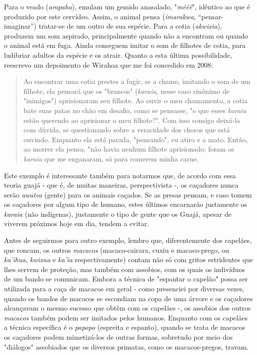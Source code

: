 Para o veado (\emph{arapaha}), emulam um gemido anasalado,
"\emph{mẽẽẽ}", idêntico ao que é produzido por este cervídeo. Assim, o
animal pensa (\emph{imarakwa}, ``pensar-imaginar'') tratar-se de um
outro de sua espécie. Para a cotia (\emph{akwixia}), produzem um som
aspirado, principalmente quando não a encontram ou quando o animal está
em fuga. Ainda conseguem imitar o som de filhotes de cotia, para
ludibriar adultos da espécie e os atrair. Quanto a esta última
possibilidade, reescrevo um depoimento de Wirahoa que me foi concedido
em 2008:

\begin{quote}
Ao encontrar uma cotia prestes a fugir, se a chamo, imitando o som de
um filhote, ela pensará que os "brancos" (\emph{karaia}, nesse caso
sinônimo de "inimigos") aprisionaram seu filhote. Ao ouvir o meu
chamamento, a cotia bate suas patas no chão em desafio, como se
pensasse, "o que esses \emph{karaia} estão querendo ao aprisionar o meu
filhote?". Com isso consigo deixá-la com dúvida, se questionando sobre a
veracidade dos choros que está ouvindo. Enquanto ela está parada,
"pensando", eu atiro e a mato. Então, ao morrer ela pensa, "não havia
nenhum filhote aprisionado; foram os \emph{karaia} que me enganaram, só
para comerem minha carne.
\end{quote}

Este exemplo é interessante também para notarmos que, de acordo com essa
teoria guajá - que é, de muitas maneiras, perspectivista -, os caçadores
nunca serão \emph{awatea} (gente) para os animais caçados. Se as presas
pensam, e caso tomem os caçadores por algum tipo de humano, estes
últimos encarnarão justamente os \emph{karaia} (não indígenas),
justamente o tipo de gente que os Guajá, apesar de viverem próximos hoje
em dia, tendem a evitar.

Antes de seguirmos para outro exemplo, lembro que, diferentemente dos
capelães, que roncam, os outros \emph{macacos} (macaco-cairara, cuxiu e
macaco-prego, ou \emph{ka'ihua}, \emph{kwixua} e \emph{ka'ia}
respectivamente) contam não só com gritos estridentes que lhes servem de
proteção, mas também com assobios, com os quais os indivíduos de um
bando se comunicam. Embora a técnica de "espantar o capelão" possa ser
utilizada para a caça de macacos em geral - como presenciei por diversas
vezes, quando os bandos de macacos se escondiam na copa de uma árvore e
os caçadores alcançavam o mesmo sucesso que obtêm com os capelães -, os
assobios dos outros \emph{macacos} também podem ser imitados pelos
humanos. Enquanto com os capelães a técnica específica é o \emph{papopo}
(espreita e espanto), quando se trata de macacos os caçadores podem
mimetizá-los de outras formas, sobretudo por meio dos "diálogos"
assobiados que os diversos primatas, como os macacos-pregos, travam.

